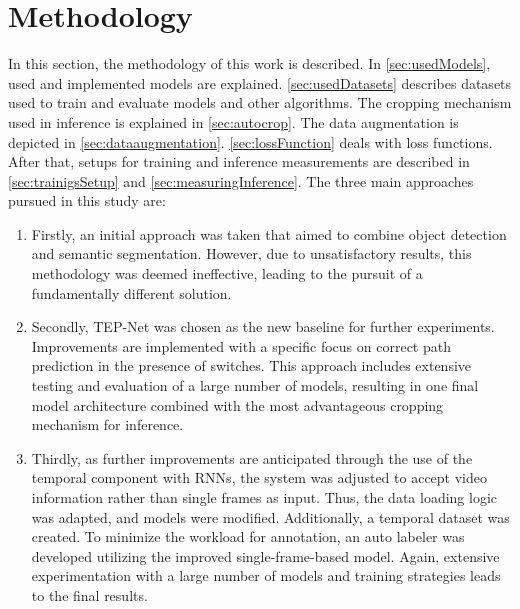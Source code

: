 \chapter{Methodology}
\label{sec:methodology}


In this section, the methodology of this work is described.
In \autoref{sec:usedModels}, used and implemented models are explained.
\autoref{sec:usedDatasets} describes datasets used to train and evaluate models and other algorithms.
The cropping mechanism used in inference is explained in \autoref{sec:autocrop}.
The data augmentation is depicted in \autoref{sec:dataaugmentation}.
\autoref{sec:lossFunction} deals with loss functions.
After that, setups for training and inference measurements are described in \autoref{sec:trainigsSetup} and \autoref{sec:measuringInference}.
The three main approaches pursued in this study are:


\begin{enumerate}
    \item Firstly, an initial approach was taken that aimed to combine object detection and semantic segmentation.
    However, due to unsatisfactory results, this methodology was deemed ineffective, leading to the pursuit of a fundamentally different solution.
    \item Secondly, \ac{TEP}-Net \cite{tepNet2024} was chosen as the new baseline for further experiments.
    Improvements are implemented with a specific focus on correct path prediction in the presence of switches. This approach includes extensive testing and evaluation of a large number of models, resulting in one final model architecture combined with the most advantageous cropping mechanism for inference.
    \item Thirdly, as further improvements are anticipated through the use of the temporal component with \ac{RNN}s, the system was adjusted to accept video information rather than single frames as input.
    Thus, the data loading logic was adapted, and models were modified.
    Additionally, a temporal dataset was created.
    To minimize the workload for annotation, an auto labeler was developed utilizing the improved single-frame-based model.
    Again, extensive experimentation with a large number of models and training strategies leads to the final results.
\end{enumerate}

